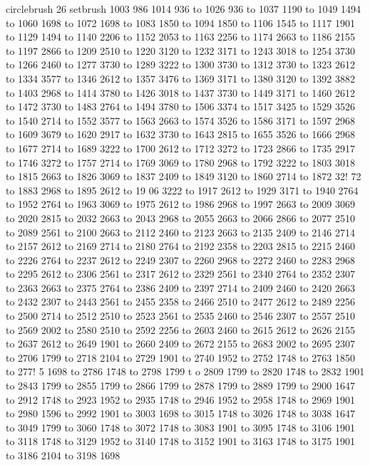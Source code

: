 circlebrush 26 setbrush
1003 986 1014 936 to 1026 936 to 1037 1190 to 1049 1494 to 1060 1698 to 1072 1698 to 1083 1850 to 1094 1850 to 1106 1545 to 1117 1901 to 1129 1494 to 1140 2206 to 1152 2053 to 1163 2256 to 1174 2663 to 1186 2155 to 1197 2866 to 1209 2510 to 1220 3120 to 1232 3171 to 1243 3018 to 1254 3730 to 1266 2460 to 1277 3730 to 1289 3222 to 1300 3730 to 1312 3730 to 1323 2612 to 1334 3577 to 1346 2612 to 1357 3476 to 1369 3171 to 1380 3120 to 1392 3882 to 1403 2968 to 1414 3780 to 1426 3018 to 1437 3730 to 1449 3171 to 1460 2612 to 1472 3730 to 1483 2764 to 1494 3780 to 1506 3374 to 1517 3425 to 1529 3526 to 1540 2714 to 1552 3577 to 1563 2663 to 1574 3526 to 1586 3171 to 1597 2968 to 1609 3679 to 1620 2917 to 1632 3730 to 1643 2815 to 1655 3526 to 1666 2968 to 1677 2714 to 1689 3222 to 1700 2612 to 1712 3272 to 1723 2866 to 1735 2917 to 1746 3272 to 1757 2714 to 1769 3069 to 1780 2968 to 1792 3222 to 1803 3018 to 1815 2663 to 1826 3069 to 1837 2409 to 1849 3120 to 1860 2714 to 1872 32!
72 to 1883 2968 to 1895 2612 to 19
06 3222 to 1917 2612 to 1929 3171 to 1940 2764 to 1952 2764 to 1963 3069 to 1975 2612 to 1986 2968 to 1997 2663 to 2009 3069 to 2020 2815 to 2032 2663 to 2043 2968 to 2055 2663 to 2066 2866 to 2077 2510 to 2089 2561 to 2100 2663 to 2112 2460 to 2123 2663 to 2135 2409 to 2146 2714 to 2157 2612 to 2169 2714 to 2180 2764 to 2192 2358 to 2203 2815 to 2215 2460 to 2226 2764 to 2237 2612 to 2249 2307 to 2260 2968 to 2272 2460 to 2283 2968 to 2295 2612 to 2306 2561 to 2317 2612 to 2329 2561 to 2340 2764 to 2352 2307 to 2363 2663 to 2375 2764 to 2386 2409 to 2397 2714 to 2409 2460 to 2420 2663 to 2432 2307 to 2443 2561 to 2455 2358 to 2466 2510 to 2477 2612 to 2489 2256 to 2500 2714 to 2512 2510 to 2523 2561 to 2535 2460 to 2546 2307 to 2557 2510 to 2569 2002 to 2580 2510 to 2592 2256 to 2603 2460 to 2615 2612 to 2626 2155 to 2637 2612 to 2649 1901 to 2660 2409 to 2672 2155 to 2683 2002 to 2695 2307 to 2706 1799 to 2718 2104 to 2729 1901 to 2740 1952 to 2752 1748 to 2763 1850 to 277!
5 1698 to 2786 1748 to 2798 1799 t
o 2809 1799 to 2820 1748 to 2832 1901 to 2843 1799 to 2855 1799 to 2866 1799 to 2878 1799 to 2889 1799 to 2900 1647 to 2912 1748 to 2923 1952 to 2935 1748 to 2946 1952 to 2958 1748 to 2969 1901 to 2980 1596 to 2992 1901 to 3003 1698 to 3015 1748 to 3026 1748 to 3038 1647 to 3049 1799 to 3060 1748 to 3072 1748 to 3083 1901 to 3095 1748 to 3106 1901 to 3118 1748 to 3129 1952 to 3140 1748 to 3152 1901 to 3163 1748 to 3175 1901 to 3186 2104 to 3198 1698
